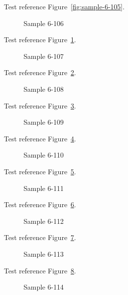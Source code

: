 Test reference Figure~\ref{fig:sample-6-105}.

\begin{figure}[tbhp]
\caption{Sample 6-106}
\label{fig:sample-6-106}
\end{figure}

Test reference Figure~\ref{fig:sample-6-106}.

\begin{figure}[tbhp]
\caption{Sample 6-107}
\label{fig:sample-6-107}
\end{figure}

Test reference Figure~\ref{fig:sample-6-107}.

\begin{figure}[tbhp]
\caption{Sample 6-108}
\label{fig:sample-6-108}
\end{figure}

Test reference Figure~\ref{fig:sample-6-108}.

\begin{figure}[tbhp]
\caption{Sample 6-109}
\label{fig:sample-6-109}
\end{figure}

Test reference Figure~\ref{fig:sample-6-109}.

\begin{figure}[tbhp]
\caption{Sample 6-110}
\label{fig:sample-6-110}
\end{figure}

Test reference Figure~\ref{fig:sample-6-110}.

\begin{figure}[tbhp]
\caption{Sample 6-111}
\label{fig:sample-6-111}
\end{figure}

Test reference Figure~\ref{fig:sample-6-111}.

\begin{figure}[tbhp]
\caption{Sample 6-112}
\label{fig:sample-6-112}
\end{figure}

Test reference Figure~\ref{fig:sample-6-112}.

\begin{figure}[tbhp]
\caption{Sample 6-113}
\label{fig:sample-6-113}
\end{figure}

Test reference Figure~\ref{fig:sample-6-113}.

\begin{figure}[tbhp]
\caption{Sample 6-114}
\label{fig:sample-6-114}
\end{figure}

